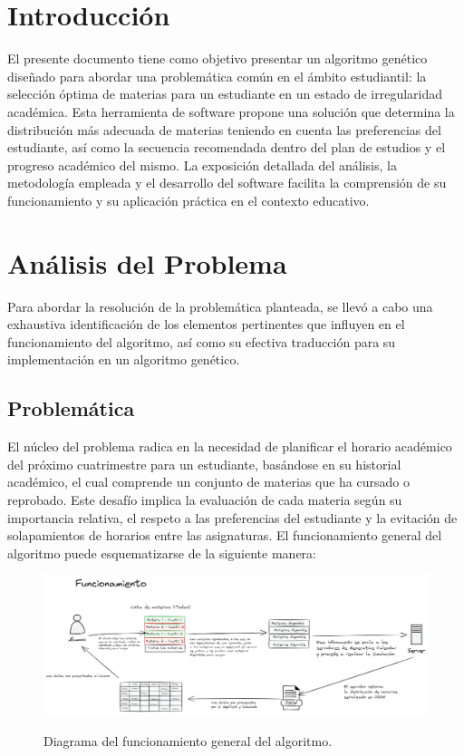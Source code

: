 \begin{minipage}[c][\textheight][c]{\linewidth}
    \section{Introducción}
    El presente documento tiene como objetivo presentar un algoritmo genético diseñado para abordar una problemática común en el ámbito estudiantil: la selección óptima de materias para un estudiante en un estado de irregularidad académica. Esta herramienta de software propone una solución que determina la distribución más adecuada de materias teniendo en cuenta las preferencias del estudiante, así como la secuencia recomendada dentro del plan de estudios y el progreso académico del mismo. La exposición detallada del análisis, la metodología empleada y el desarrollo del software facilita la comprensión de su funcionamiento y su aplicación práctica en el contexto educativo.
\end{minipage}

\newpage


\section{Análisis del Problema}
Para abordar la resolución de la problemática planteada, se llevó a cabo una exhaustiva identificación de los elementos pertinentes que influyen en el funcionamiento del algoritmo, así como su efectiva traducción para su implementación en un algoritmo genético.

\subsection{Problemática}
El núcleo del problema radica en la necesidad de planificar el horario académico del próximo cuatrimestre para un estudiante, basándose en su historial académico, el cual comprende un conjunto de materias que ha cursado o reprobado. Este desafío implica la evaluación de cada materia según su importancia relativa, el respeto a las preferencias del estudiante y la evitación de solapamientos de horarios entre las asignaturas. El funcionamiento general del algoritmo puede esquematizarse de la siguiente manera:

\begin{figure}[h]
    \centering
    \includegraphics[width=\textwidth]{images/AG-funcionamiento.png}
    \label{Diagrama del funcionamiento general del algoritmo.}
    \caption{Diagrama del funcionamiento general del algoritmo.}
\end{figure}

